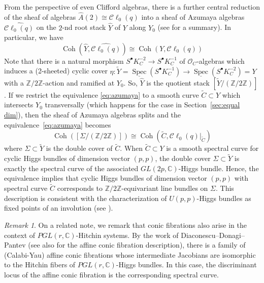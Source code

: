 \documentclass[11pt]{amsart}
\theoremstyle{plain}
\theoremstyle{definition}
\theoremstyle{remark}
\newtheorem{rem}[theorem]{Remark}
\def\Z{\mathbb{Z}}
\def\C{\mathbb{C}}
\def\O{\mathcal{O}}
\def\wA{\widehat{A}}
\def\tC{\widetilde{C}}
\def\tY{\widetilde{Y}}
\begin{document}
    
        From the perspective of even Clifford algebras, there is a further central reduction of the sheaf of algebras $\wA(2)\cong \mathcal{C}\ell_0(q)$ into a sheaf of Azumaya algebras $\widehat{\mathcal{C}\ell_0(q)}$ on the $2$-nd root stack $\widehat{Y}$ of $Y$ along $Y_0$ \cite[Section 3.6]{kuznetsov-quadric} (see \cite[Section 3.1-3.2]{lee-clifford} for a summary). In particular, we have 
        \begin{equation}\label{eq:azumaya}
            \operatorname{Coh}(\widehat{Y}, \widehat{\mathcal{C}\ell_0(q)})\cong \operatorname{Coh}(Y, \mathcal{C}\ell_0(q))
        \end{equation}
        Note that there is a natural morphism $S^\bullet K_C^{-2}\to S^{\bullet} K_C^{-1}$ of $\O_C$-algebras which induces a (2-sheeted) cyclic cover $\eta: \tY = \underline{\operatorname{Spec}}(S^{\bullet} K_C^{-1})\to\underline{\operatorname{Spec}}(S^{\bullet} K_C^{-2})= Y$ with a $\Z/2\Z$-action and ramified at $Y_0$. So, $\widehat{Y}$ is the quotient stack $\left[\tY/ (\Z/2\Z)\right]$. If we restrict the equivalence \ref{eq:azumaya} to a smooth curve $\tC\subset Y$ which intersects $Y_0$ transversally (which happens for the case in Section~\ref{sec:equal dim}), then the sheaf of Azumaya algebras splits \cite[Corollary 3.16]{kuznetsov-quadric} and the equivalence~\ref{eq:azumaya} becomes 
        \[     \operatorname{Coh}\left(\left[\Sigma/ (\Z/2\Z)\right]\right)\cong \operatorname{Coh}(\tC, \mathcal{C}\ell_0(q)|_{\tC}) \]
        where $\Sigma\subset \tilde{Y}$ is the double cover of $\tC$. When $\tC\subset Y$ is a smooth spectral curve for cyclic Higgs bundles of dimension vector $(p,p)$, the double cover $\Sigma\subset \widetilde{Y}$ is exactly the spectral curve of the associated $GL(2p,\C)$-Higgs bundle. Hence, the equivalence implies that cyclic Higgs bundles of dimension vector $(p,p)$ with spectral curve $\tC$ corresponds to $\Z/2\Z$-equivariant line bundles on $\Sigma$. This description is consistent with the characterization of $U(p,p)$-Higgs bundles as fixed points of an involution (see \cite[Proposition 3]{schaposnik14}).
        

    

    \begin{rem}
        On a related note, we remark that conic fibrations also arise in the context of $PGL(r,\C)$-Hitchin systems. By the work of Diaconescu--Donagi--Pantev \cite{DDP} (see also \cite[Section 8.8]{kontsevich-soibelman} for the affine conic fibration description), 
        there is a family of (Calabi-Yau) affine conic fibrations whose intermediate Jacobians are isomorphic to the Hitchin fibers of $PGL(r,\C)$-Higgs bundles. In this case, the discriminant locus of the affine conic fibration is the corresponding spectral curve. 


    
    \end{rem}
\end{document}
